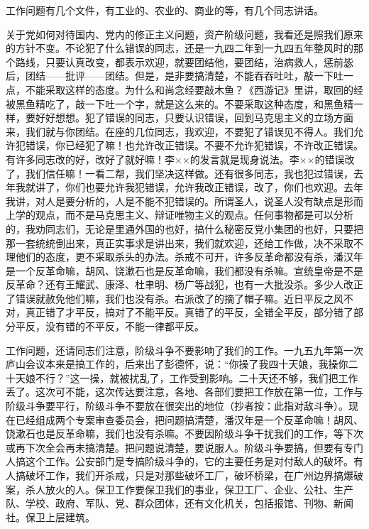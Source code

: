 工作问题有几个文件，有工业的、农业的、商业的等，有几个同志讲话。

关于党如何对待国内、党内的修正主义问题，资产阶级问题，我看还是照我们原来的方针不变。不论犯了什么错误的同志，还是一九四二年到一九四五年整风时的那个路线，只要认真改变，都表示欢迎，就要团结他，要团结，治病救人，惩前毖后，团结——批评——团结。但是，是非要搞清楚，不能吞吞吐吐，敲一下吐一点，不能采取这样的态度。为什么和尚念经要敲木鱼？《西游记》里讲，取回的经被黑鱼精吃了，敲一下吐一个字，就是这么来的。不要采取这种态度，和黑鱼精一样，要好好想想。犯了错误的同志，只要认识错误，回到马克思主义的立场方面来，我们就与你团结。在座的几位同志，我欢迎，不要犯了错误见不得人。我们允许犯错误，你已经犯了嘛！也允许改正错误。不要不允许犯错误，不许改正错误。有许多同志改的好，改好了就好嘛！李××的发言就是现身说法。李××的错误改了，我们信任嘛！一看二帮，我们坚决这样做。还有很多同志，我也犯过错误，去年我就讲了，你们也要允许我犯错误，允许我改正错误，改了，你们也欢迎。去年我讲，对人是要分析的，人是不能不犯错误的。所谓圣人，说圣人没有缺点是形而上学的观点，而不是马克思主义、辩证唯物主义的观点。任何事物都是可以分析的，我劝同志们，无论是里通外国的也好，搞什么秘密反党小集团的也好，只要把那一套统统倒出来，真正实事求是讲出来，我们就欢迎，还给工作做，决不采取不理他们的态度，更不采取杀头的办法。杀戒不可开，许多反革命都没有杀，潘汉年是一个反革命嘛，胡风、饶漱石也是反革命嘛，我们都没有杀嘛。宣统皇帝是不是反革命？还有王耀武、康泽、杜聿明、杨广等战犯，也有一大批没杀。多少人改正了错误就赦免他们嘛，我们也没有杀。右派改了的摘了帽子嘛。近日平反之风不对，真正错了才平反，搞对了不能平反。真错了的平反，全错全平反，部分错了部分平反，没有错的不平反，不能一律都平反。

工作问题，还请同志们注意，阶级斗争不要影响了我们的工作。一九五九年第一次庐山会议本来是搞工作的，后来出了彭德怀，说：“你操了我四十天娘，我操你二十天娘不行？”这一操，就被扰乱了，工作受到影响。二十天还不够，我们把工作丢了。这次可不能，这次传达要注意，各地、各部们要把工作放在第一位，工作与阶级斗争要平行，阶级斗争不要放在很突出的地位（抄者按：此指对敌斗争）。现在已经组成两个专案审查委员会，把问题搞清楚，潘汉年是一个反革命嘛！胡风、饶漱石也是反革命嘛，我们也没有杀嘛。不要因阶级斗争干扰我们的工作，等下次或再下次全会再未搞清楚。把问题说清楚，要说服人。阶级斗争要搞，但要有专门人搞这个工作。公安部门是专搞阶级斗争的，它的主要任务是对付敌人的破坏。有人搞破坏工作，我们开杀戒，只是对那些破坏工厂，破坏桥梁，在广州边界搞爆破案，杀人放火的人。保卫工作要保卫我们的事业，保卫工厂、企业、公社、生产队、学校、政府、军队、党、群众团体，还有文化机关，包括报馆、刊物、新闻社。保卫上层建筑。

